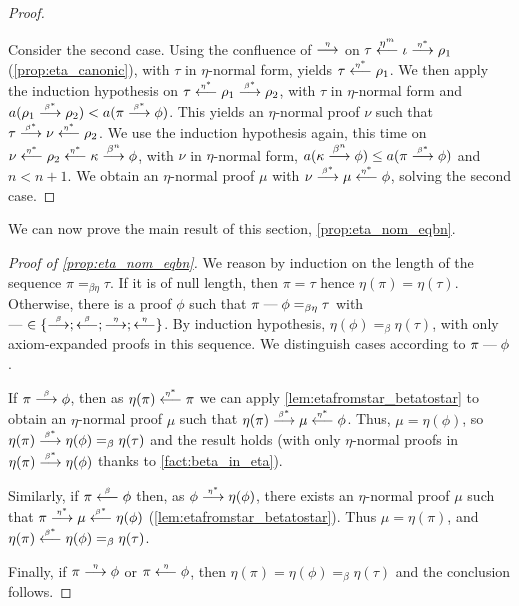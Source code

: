 \documentclass{lmcs}
\newenvironment{myscopec}[1]{
\begin{scope}[every node/.style={circle,thick,draw=#1,minimum size=8mm,inner sep=0}, every edge/.style={->,draw=#1,thick}, every path/.style={draw=#1, thick}]
\color{#1}
}{
\end{scope}
}
\newcommand{\edgelabel}[1]{edge node[draw=none, sloped, align=center]{#1 \\}}
\newcommand*{\eqeq}{=} %
\newcommand{\symboltext}[2]{\mathrel{\overset{\makebox[0pt]{\mbox{\normalfont\tiny\sffamily \ensuremath{#1}}}}{#2}}} %
\newcommand{\cadratin}{\mathrel{\text{\textemdash}}} %
\newcommand{\etato}{\symboltext{\eta}{\longrightarrow}}
\newcommand{\etafrom}{\symboltext{\eta}{\longleftarrow}}
\newcommand{\etatostar}{\symboltext{\eta^*}{\longrightarrow}}
\newcommand{\etafromstar}{\symboltext{\eta^*}{\longleftarrow}}
\newcommand{\betato}{\symboltext{\beta}{\longrightarrow}}
\newcommand{\betafrom}{\symboltext{\beta}{\longleftarrow}}
\newcommand{\betatostar}{\symboltext{\beta^*}{\longrightarrow}}
\newcommand{\betafromstar}{\symboltext{\beta^*}{\longleftarrow}}
\newcommand{\eqb}{\mathrel{\eqeq_{\beta}}}
\newcommand{\eqbn}{\mathrel{\eqeq_{\beta\eta}}}
\begin{document}
\begin{proof}
\begin{center}
\end{center}
Consider the second case.
Using the confluence of $\etato$ on $\tau\overset{\eta^m}{\longleftarrow}\iota\etatostar\rho_1$ (\autoref{prop:eta_canonic}), with $\tau$ in $\eta$-normal form, yields $\tau\etafromstar\rho_1$.
We then apply the induction hypothesis on $\tau\etafromstar\rho_1\betatostar\rho_2$, with $\tau$ in $\eta$-normal form and $a(\rho_1\betatostar\rho_2)< a(\pi\betatostar\phi)$.
This yields an $\eta$-normal proof $\nu$ such that $\tau\betatostar\nu\etafromstar\rho_2$.
We use the induction hypothesis again, this time on $\nu\etafromstar\rho_2\etafromstar\kappa\overset{\beta^n}{\longrightarrow}\phi$, with $\nu$ in $\eta$-normal form, $a(\kappa\overset{\beta^n}{\longrightarrow}\phi)\leq a(\pi\betatostar\phi)$ and $n<n+1$.
We obtain an $\eta$-normal proof $\mu$ with $\nu\betatostar\mu\etafromstar\phi$, solving the second case.
\end{proof}

We can now prove the main result of this section, \autoref{prop:eta_nom_eqbn}.

\begin{proof}[Proof of \autoref{prop:eta_nom_eqbn}]
\label{proof:eta_nom_eqbn}
We reason by induction on the length of the sequence $\pi\eqbn\tau$.
If it is of null length, then $\pi=\tau$ hence $\eta(\pi)=\eta(\tau)$.
Otherwise, there is a proof $\phi$ such that $\pi\cadratin\phi\eqbn\tau$ with $\cadratin~\in\{\betato;\betafrom;\etato;\etafrom\}$.
By induction hypothesis, $\eta(\phi)\eqb\eta(\tau)$, with only axiom-expanded proofs in this sequence.
We distinguish cases according to $\pi\cadratin\phi$.

If $\pi\betato\phi$, then as $\eta(\pi)\etafromstar\pi$ we can apply \autoref{lem:etafromstar_betatostar} to obtain an $\eta$-normal proof $\mu$ such that $\eta(\pi)\betatostar\mu\etafromstar\phi$.
Thus, $\mu=\eta(\phi)$, so $\eta(\pi)\betatostar\eta(\phi)\eqb\eta(\tau)$ and the result holds (with only $\eta$-normal proofs in $\eta(\pi)\betatostar\eta(\phi)$ thanks to \autoref{fact:beta_in_eta}).

Similarly, if $\pi\betafrom\phi$ then, as $\phi\etatostar\eta(\phi)$, there exists an $\eta$-normal proof $\mu$ such that $\pi\etatostar\mu\betafromstar\eta(\phi)$ (\autoref{lem:etafromstar_betatostar}).
Thus $\mu=\eta(\pi)$, and $\eta(\pi)\betafromstar\eta(\phi)\eqb\eta(\tau)$.

Finally, if $\pi\etato\phi$ or $\pi\etafrom\phi$, then $\eta(\pi)=\eta(\phi)\eqb\eta(\tau)$ and the conclusion follows.
\end{proof}
\end{document}
